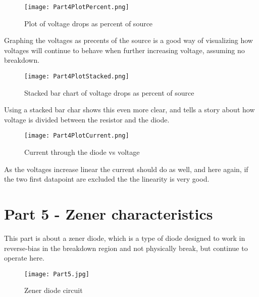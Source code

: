 \documentclass{article}
\begin{document}
\begin{figure}[h] %
\centering
\texttt{[image: Part4PlotPercent.png]}
\caption{Plot of voltage drops as percent of source}
\label{fig:part4percent}
\end{figure}
Graphing the voltages as precents of the source is a good way of visualizing how voltages will continue to behave when further increasing voltage, assuming no breakdown.
\clearpage

\begin{figure}[h] %
\centering
\texttt{[image: Part4PlotStacked.png]}
\caption{Stacked bar chart of voltage drops as percent of source}
\label{fig:part4stacked}
\end{figure}
Using a stacked bar char shows this even more clear, and tells a story about how voltage is divided between the resistor and the diode.
\clearpage

\begin{figure}[h] %
\centering
\texttt{[image: Part4PlotCurrent.png]}
\caption{Current through the diode vs voltage}
\label{fig:part4current}
\end{figure}
As the voltages increase linear the current should do as well, and here again, if the two first datapoint are excluded the the linearity is very good.


\section{Part 5 - Zener characteristics}
This part is about a zener diode, which is a type of diode designed to work in reverse-bias in the breakdown region and not physically break, but continue to operate here.

\begin{figure}[h] %
\centering
\texttt{[image: Part5.jpg]}
\caption{Zener diode circuit}
\label{fig:part5}
\end{figure}
\end{document}
